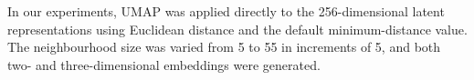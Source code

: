 In our experiments, UMAP was applied directly to the 256-dimensional latent representations using
Euclidean distance and the default minimum-distance value. The neighbourhood size was varied
from 5 to 55 in increments of 5, and both two- and three-dimensional embeddings were generated.

